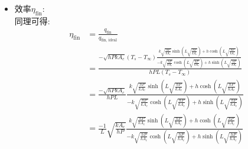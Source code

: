 \documentclass[../main.tex]{subfiles}
\begin{document}
\begin{itemize}
\begin{itemize}
\begin{itemize}
      \begin{align}
        q_\text{fin} &= -kA_c \frac{dT}{dx}\bigg|_{x=0} \nonumber\\
        \frac{dT}{dx} &= (T_s - T_\infty) \frac{d}{dx}\left[
          \cosh(mx)
        \right] + C_2 \frac{d}{dx}\left[
          \sinh(mx)
        \right] \nonumber\\
        &= (T_s - T_\infty) \left[
          m \sinh(mx)
        \right] + C_2 \left[
          m \cosh(mx)
        \right] \nonumber\\
        \Rightarrow\quad& \frac{dT}{dx}\bigg|_{x=0} = (T_s - T_\infty) \left[
          0
        \right] + C_2 \left[
          m
        \right] = m C_2
      \end{align}
      故有限長鰭片熱通量為:
      \begin{align}
        q_\text{fin} &= -kA_c m C_2 \nonumber\\
        &= -\sqrt{hPkA_c} (T_s - T_\infty) \frac{
          k m \sinh(mL) + h \cosh(mL)
        }{
          -k m \cosh(mL) + h \sinh(mL)
        } \nonumber\\
        &= \boxed{-\sqrt{hPkA_c} (T_s - T_\infty) \frac{
          k \sqrt{\frac{hP}{kA_c}} \sinh\left(L\sqrt{\frac{hP}{kA_c}}\right) + h \cosh\left(L\sqrt{\frac{hP}{kA_c}}\right)
        }{
          -k \sqrt{\frac{hP}{kA_c}} \cosh\left(L\sqrt{\frac{hP}{kA_c}}\right) + h \sinh\left(L\sqrt{\frac{hP}{kA_c}}\right)
        } } 
      \end{align}
    \item 效率$\eta_\text{fin}$:\\
      同理可得:
      \begin{align}
        \eta_\text{fin} &= \frac{q_\text{fin}}{q_{\text{fin, ideal}}} \nonumber\\
        &= \frac{-\sqrt{hPkA_c} (T_s - T_\infty) \frac{
          k \sqrt{\frac{hP}{kA_c}} \sinh\left(L\sqrt{\frac{hP}{kA_c}}\right) + h \cosh\left(L\sqrt{\frac{hP}{kA_c}}\right)
        }{
          -k \sqrt{\frac{hP}{kA_c}} \cosh\left(L\sqrt{\frac{hP}{kA_c}}\right) + h \sinh\left(L\sqrt{\frac{hP}{kA_c}}\right)
        } }{h P L (T_s - T_\infty)} \nonumber\\
        &= \frac{-\sqrt{hPkA_c}}{h P L} \frac{
          k \sqrt{\frac{hP}{kA_c}} \sinh\left(L\sqrt{\frac{hP}{kA_c}}\right) + h \cosh\left(L\sqrt{\frac{hP}{kA_c}}\right)
        }{
          -k \sqrt{\frac{hP}{kA_c}} \cosh\left(L\sqrt{\frac{hP}{kA_c}}\right) + h \sinh\left(L\sqrt{\frac{hP}{kA_c}}\right)
        } \nonumber\\
        &= \boxed{ \frac{-1}{L} \sqrt{\frac{kA_c}{hP}} \frac{
          k \sqrt{\frac{hP}{kA_c}} \sinh\left(L\sqrt{\frac{hP}{kA_c}}\right) + h \cosh\left(L\sqrt{\frac{hP}{kA_c}}\right)
        }{
          -k \sqrt{\frac{hP}{kA_c}} \cosh\left(L\sqrt{\frac{hP}{kA_c}}\right) + h \sinh\left(L\sqrt{\frac{hP}{kA_c}}\right)
        } } 
      \end{align}
  \end{itemize}
  \end{itemize}
\end{itemize}
\end{document}
